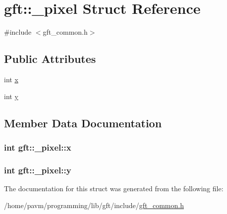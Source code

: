 \hypertarget{structgft_1_1__pixel}{\section{gft\-:\-:\-\_\-pixel Struct Reference}
\label{structgft_1_1__pixel}
}


{\ttfamily \#include $<$gft\-\_\-common.\-h$>$}

\subsection*{Public Attributes}
\begin{DoxyCompactItemize}
\item 
int \hyperlink{structgft_1_1__pixel_a9678bac037aebc2cb711925afe43a0ae}{x}
\item 
int \hyperlink{structgft_1_1__pixel_a68f220fa300abbb0827f6908f33ffc90}{y}
\end{DoxyCompactItemize}


\subsection{Member Data Documentation}
\hypertarget{structgft_1_1__pixel_a9678bac037aebc2cb711925afe43a0ae}{
\subsubsection[{x}]{\setlength{\rightskip}{0pt plus 5cm}int gft\-::\-\_\-pixel\-::x}}\label{structgft_1_1__pixel_a9678bac037aebc2cb711925afe43a0ae}
\hypertarget{structgft_1_1__pixel_a68f220fa300abbb0827f6908f33ffc90}{
\subsubsection[{y}]{\setlength{\rightskip}{0pt plus 5cm}int gft\-::\-\_\-pixel\-::y}}\label{structgft_1_1__pixel_a68f220fa300abbb0827f6908f33ffc90}


The documentation for this struct was generated from the following file\-:\begin{DoxyCompactItemize}
\item 
/home/pavm/programming/lib/gft/include/\hyperlink{gft__common_8h}{gft\-\_\-common.\-h}\end{DoxyCompactItemize}
